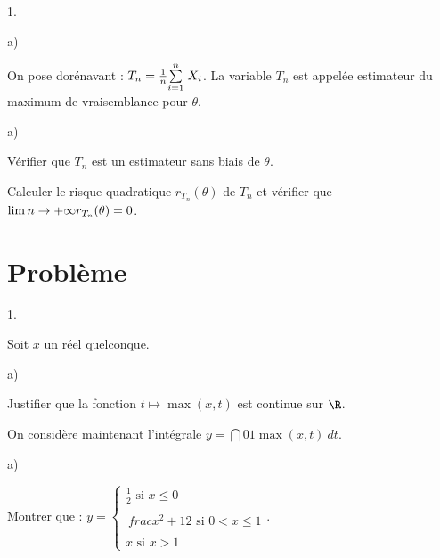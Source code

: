 \documentclass[11pt]{article}%
\begin{document}
\begin{noliste}{1.}
\begin{noliste}{a)}
\end{noliste}

On pose dorénavant : $T_{n} = \frac{1}{n} {\textstyle\sum\limits_{i = 1}^{n}}\hspace{.1cm} X_{i}$. La
variable $T_{n}$ est appelée estimateur du maximum de vraisemblance
pour $\theta$.

\begin{noliste}{a)}
 \setlength{\itemsep}{2mm}

\item Vérifier que $T_{n}$ est un estimateur sans biais de $\theta$.

\item Calculer le risque quadratique $r_{T_{n}} (\theta)$ de $T_{n}$ et
vérifier que $\lim{n \rightarrow + \infty} r_{T_{n}} (\theta) = 0$.

\end{noliste}

\end{noliste}

\section*{Problème}

\begin{noliste}{1.}
 \setlength{\itemsep}{4mm}

\item Soit $x$ un réel quelconque. \begin{noliste}{a)}
 \setlength{\itemsep}{2mm}

\item Justifier que la fonction $t \mapsto \max ( x, t)$ est continue
sur $\R$.

\end{noliste}

On considère maintenant l'intégrale $y = \dint{0}{1} \max (x,t)\ dt$.

\begin{noliste}{a)}
 \setlength{\itemsep}{2mm}

\item Montrer que : $y = \left\{ 
\begin{array}{l}
 \frac{1}{2} \text{ si } x \leq 0 \\
\\\
frac{ x^{2} + 1 }{ 2 } \text{ si } 0 < x \leq 1 \\
\\x \text{ si } x > 1
\end{array}
\right.$.

\end{noliste}

\end{noliste}
\end{document}
